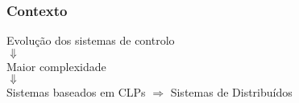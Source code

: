 \begin{frame}
	\frametitle{Contexto}
	\centering
	Evoluç\~{a}o dos sistemas de controlo \\
	$\Downarrow$ \\
	Maior complexidade \\
	$\Downarrow$ \\
	Sistemas baseados em CLPs $\Rightarrow$ Sistemas de Distribu\'{i}dos
\end{frame}
